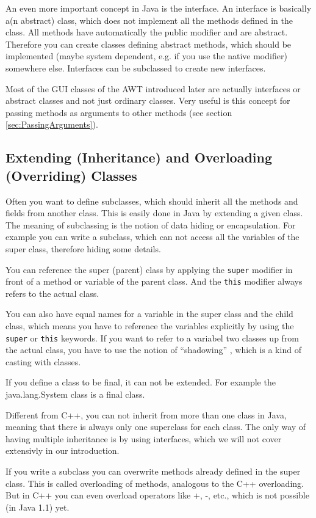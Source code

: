 An even more important concept in Java is the interface.
An interface is basically a(n abstract) class, which does not implement 
all the
methods defined in the class. All methods have automatically the public
modifier and are abstract.
Therefore you can create classes defining abstract methods,
which should be implemented (maybe system dependent, e.g. if you use
the native modifier) somewhere else. Interfaces can be subclassed
to create new interfaces.

Most of the GUI classes of the AWT introduced later are
actually interfaces or abstract classes and not just ordinary classes.
Very useful is this concept for passing methods as arguments to
other methods (see section \ref{sec:PassingArguments}).


\subsection{Extending (Inheritance) and Overloading (Overriding) Classes}
Often you want to define subclasses, which should inherit all
the methods and fields from another class. This is easily done
in Java by extending a given class. The meaning of subclassing is the
notion of data hiding or encapsulation. For example you can write
a subclass, which can not access all the variables of the super class,
therefore hiding some details. 

You can reference the super (parent) class by applying the
\verb|super| modifier in front of a method or variable of
the parent class. And the \verb|this| modifier always refers to
the actual class. 

You can also have equal names for a variable in the super class and the
child class, which means you have to reference the variables explicitly
by using the \verb|super| or \verb|this| keywords. If you want to refer
to a variabel two classes up from the actual class, you have to use
the notion of ``shadowing'' \cite[]{javanutshell}, which is a kind of
casting with classes. 

If you define a class to be final, it can not be extended.
For example the java.lang.System class is a final class.

Different from C++,  you can not inherit from more than one class
in Java, meaning that there is always only one superclass for each
class. 
The only way of having multiple inheritance is by using
interfaces, which we will not cover extensivly in our introduction.

If you write a subclass you can overwrite methods already defined
in the super class. This is called overloading of methods,
analogous to the C++ overloading. But in C++ you can even
overload operators like +, -, etc., which is not possible (in Java 1.1) yet.

